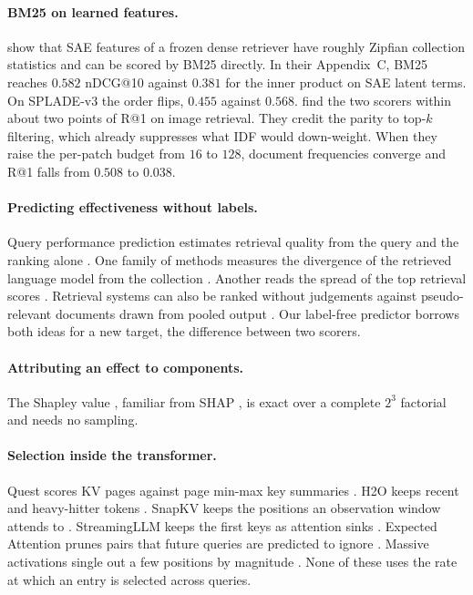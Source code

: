 \documentclass[11pt]{article}
\begin{document}
\paragraph{BM25 on learned features.} \citet{clavie2026latent} show that SAE features of a
frozen dense retriever have roughly Zipfian collection statistics and can be scored by
BM25 directly. In their Appendix~C, BM25 reaches $0.582$ nDCG@10 against $0.381$ for the
inner product on SAE latent terms. On SPLADE-v3 the order flips, $0.455$ against $0.568$.
\citet{han2026bm25v} find the two scorers within about two points of R@1 on image
retrieval. They credit the parity to top-$k$ filtering, which already suppresses what IDF
would down-weight. When they raise the per-patch budget from $16$ to $128$, document
frequencies converge and R@1 falls from $0.508$ to $0.038$.

\paragraph{Predicting effectiveness without labels.} Query performance prediction
estimates retrieval quality from the query and the ranking alone
\citep{carmel2010difficulty}. One family of methods measures the divergence of the
retrieved language model from the collection \citep{cronen2002clarity}. Another reads the
spread of the top retrieval scores \citep{shtok2012nqc}. Retrieval systems can also be
ranked without judgements against pseudo-relevant documents drawn from pooled output
\citep{soboroff2001ranking}. Our label-free predictor borrows both ideas for a new target,
the difference between two scorers.

\paragraph{Attributing an effect to components.} The Shapley value
\citep{shapley1953value}, familiar from SHAP \citep{lundberg2017shap}, is exact over a
complete $2^3$ factorial and needs no sampling.

\paragraph{Selection inside the transformer.} Quest scores KV pages against page min-max
key summaries \citep{tang2024quest}. H2O keeps recent and heavy-hitter tokens
\citep{zhang2023h2o}. SnapKV keeps the positions an observation window attends to
\citep{li2024snapkv}. StreamingLLM keeps the first keys as attention sinks
\citep{xiao2024streamingllm}. Expected Attention prunes pairs that future queries are
predicted to ignore \citep{devoto2025expectedattention}. Massive activations single out a
few positions by magnitude \citep{sun2024massive}. None of these uses the rate at which an
entry is selected across queries.
\end{document}
